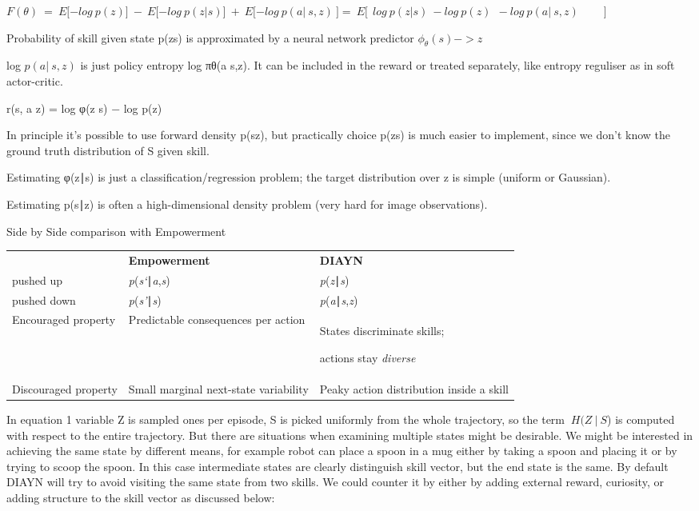 $F(\theta)\  = \ E\lbrack - log\ p(z)\rbrack\  - \ E\lbrack - log\ p(z|s)\rbrack\  + \ E\lbrack - log\ p(a|\ s,z)\ \rbrack = \ E\lbrack\ \ log\ p(z|s)\  - log\ p(z)\ \  - log\ p(a|\ s,z)\ \ \ \ \ \ \ \ \ \ \rbrack$

Probability of skill given state p(z\textbar s) is approximated by a neural network predictor $\phi_{\theta}(s) - > z\ $

log $p(a|\ s,z)$ is just policy entropy log πθ(a\textbar{} s,z). It can be included in the reward or treated separately, like entropy reguliser as in soft actor-critic.

r(s, a\textbar{} z) = log φ(z \textbar{} s) − log p(z)

In principle it's possible to use forward density p(s\textbar z), but practically choice p(z\textbar s) is much easier to implement, since we don't know the ground truth distribution of S given skill.

Estimating φ(z∣s) is just a classification/regression problem; the target distribution over z is simple (uniform or Gaussian).

Estimating p(s∣z) is often a high-dimensional density problem (very hard for image observations).

Side by Side comparison with Empowerment

{\def\LTcaptype{none} %
\begin{longtable}[]{@{}
  >{\centering\arraybackslash}p{}
  >{\raggedright\arraybackslash}p{}
  >{\raggedright\arraybackslash}p{}@{}}
\toprule\noalign{}
\endhead
\bottomrule\noalign{}
\endlastfoot
& \textbf{Empowerment} & \textbf{DIAYN} \\
pushed up & \emph{p}(\emph{s`}∣\emph{a},\emph{s}) & \emph{p}(\emph{z}∣\emph{s}) \\
pushed down & \emph{p}(\emph{s'}∣\emph{s}) & \emph{p}(\emph{a}∣\emph{s},\emph{z}) \\
Encouraged property & Predictable consequences per action & States discriminate skills;

actions stay \emph{diverse} \\
Discouraged property & Small marginal next-state variability & Peaky action distribution inside a skill \\
\end{longtable}
}

In equation 1 variable Z is sampled ones per episode, S is picked uniformly from the whole trajectory, so the term $\ H(Z\ |\ S$) is computed with respect to the entire trajectory. But there are situations when examining multiple states might be desirable. We might be interested in achieving the same state by different means, for example robot can place a spoon in a mug either by taking a spoon and placing it or by trying to scoop the spoon. In this case intermediate states are clearly distinguish skill vector, but the end state is the same. By default DIAYN will try to avoid visiting the same state from two skills. We could counter it by either by adding external reward, curiosity, or adding structure to the skill vector as discussed below:

